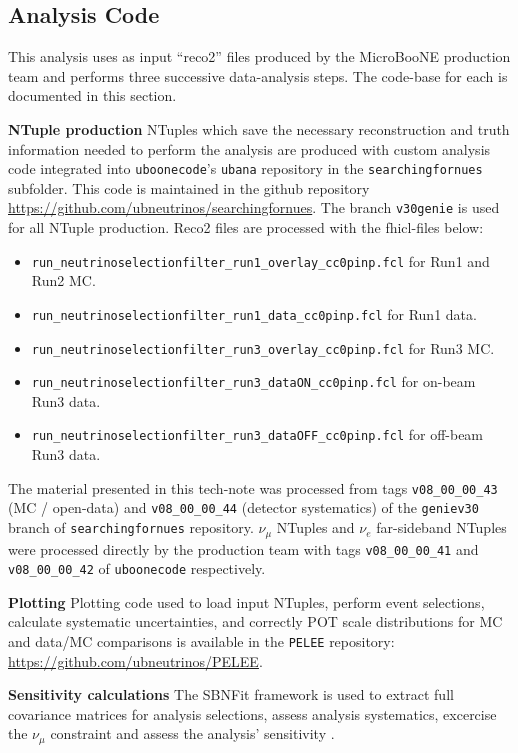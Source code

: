 \subsection{Analysis Code}
\par This analysis uses as input ``reco2'' files produced by the MicroBooNE production team and performs three successive data-analysis steps. The code-base for each is documented in this section.
\par \textbf{NTuple production} NTuples which save the necessary reconstruction and truth information needed to perform the analysis are produced with custom analysis code integrated into \texttt{uboonecode}'s \texttt{ubana} repository in the \texttt{searchingfornues} subfolder. This code is maintained in the github repository \url{https://github.com/ubneutrinos/searchingfornues}. The branch \texttt{v30genie} is used for all NTuple production. Reco2 files are processed with the fhicl-files below:
\begin{itemize}
    \item \texttt{run\_neutrinoselectionfilter\_run1\_overlay\_cc0pinp.fcl} for Run1 and Run2 MC.
    \item \texttt{run\_neutrinoselectionfilter\_run1\_data\_cc0pinp.fcl} for Run1 data.
    \item \texttt{run\_neutrinoselectionfilter\_run3\_overlay\_cc0pinp.fcl} for Run3 MC.
    \item \texttt{run\_neutrinoselectionfilter\_run3\_dataON\_cc0pinp.fcl} for on-beam Run3 data.
    \item \texttt{run\_neutrinoselectionfilter\_run3\_dataOFF\_cc0pinp.fcl} for off-beam Run3 data.
\end{itemize}
The material presented in this tech-note was processed from tags \texttt{v08\_00\_00\_43} (MC / open-data) and \texttt{v08\_00\_00\_44} (detector systematics) of the \texttt{geniev30} branch of \texttt{searchingfornues} repository. $\nu_{\mu}$ NTuples and $\nu_e$ far-sideband NTuples were processed directly by the production team with tags \texttt{v08\_00\_00\_41} and \texttt{v08\_00\_00\_42} of \texttt{uboonecode} respectively.
\par \textbf{Plotting} Plotting code used to load input NTuples, perform event selections, calculate systematic uncertainties, and correctly POT scale distributions for MC and data/MC comparisons is available in the \texttt{PELEE} repository: \url{https://github.com/ubneutrinos/PELEE}.
\par \textbf{Sensitivity calculations} The SBNFit framework is used to extract full covariance matrices for analysis selections, assess analysis systematics, excercise the $\nu_{\mu}$ constraint and assess the analysis' sensitivity \cite{bib:sbnfitgit}.

